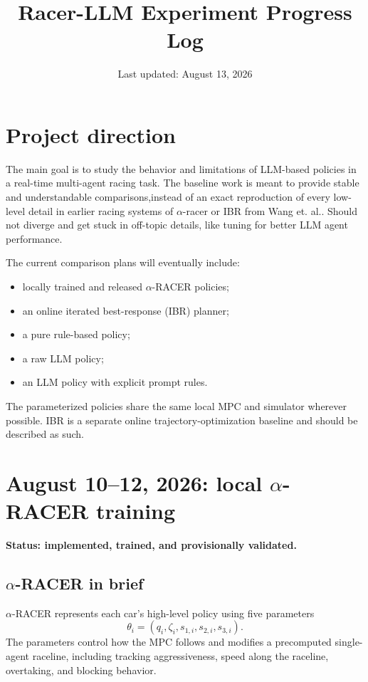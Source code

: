 \documentclass[11pt]{article}
\title{Racer-LLM Experiment Progress Log}
\author{}
\date{Last updated: August 13, 2026}
\newcommand{\status}[1]{\textcolor{blue!65!black}{\textbf{#1}}}
\begin{document}
\maketitle

\section{Project direction}

The main goal is to study the behavior and limitations of LLM-based policies in
a real-time multi-agent racing task. The baseline work is meant to provide
stable and understandable comparisons,instead of an exact
reproduction of every low-level detail in earlier racing systems of $\alpha$-racer or IBR from Wang et. al.. Should not diverge and get stuck in off-topic details, like tuning for better LLM agent performance.

The current comparison plans will eventually include:
\begin{itemize}
  \item locally trained and released $\alpha$-RACER policies;
  \item an online iterated best-response (IBR) planner;
  \item a pure rule-based policy;
  \item a raw LLM policy;
  \item an LLM policy with explicit prompt rules.
\end{itemize}

The parameterized policies share the same local MPC and simulator wherever
possible. IBR is a separate online trajectory-optimization baseline and should
be described as such.

\section{August 10--12, 2026: local $\alpha$-RACER training}

\status{Status: implemented, trained, and provisionally validated.}

\subsection{$\alpha$-RACER in brief}

$\alpha$-RACER represents each car's high-level policy using five parameters
\[
  \theta_i=(q_i,\zeta_i,s_{1,i},s_{2,i},s_{3,i}).
\]
The parameters control how the MPC follows and modifies a precomputed
single-agent raceline, including tracking aggressiveness, speed along the
raceline, overtaking, and blocking behavior.
\end{document}
